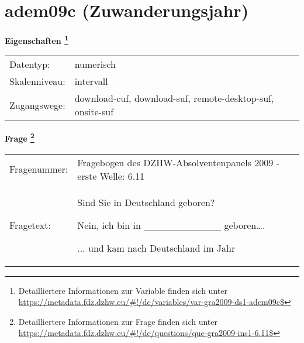 
    \setcounter{footnote}{0}

    \vspace*{-1.8cm}
	\section{adem09c (Zuwanderungsjahr)}
	\label{section:adem09c}



    \vspace*{0.5cm}
    \noindent\textbf{Eigenschaften
	\footnote{Detailliertere Informationen zur Variable finden sich unter
		\url{https://metadata.fdz.dzhw.eu/\#!/de/variables/var-gra2009-ds1-adem09c$}}}\\
	\begin{tabularx}{\hsize}{@{}lX}
	Datentyp: & numerisch \\
	Skalenniveau: & intervall \\
	Zugangswege: &
	  download-cuf, 
	  download-suf, 
	  remote-desktop-suf, 
	  onsite-suf
 \\
    \end{tabularx}



				\vspace*{0.5cm}
                \noindent\textbf{Frage
	                \footnote{Detailliertere Informationen zur Frage finden sich unter
		              \url{https://metadata.fdz.dzhw.eu/\#!/de/questions/que-gra2009-ins1-6.11$}}}\\
				\begin{tabularx}{\hsize}{@{}lX}
					Fragenummer: &
					  Fragebogen des DZHW-Absolventenpanels 2009 - erste Welle:
					  6.11
 \\
					Fragetext: & Sind Sie in Deutschland geboren?\par  Nein, ich bin in \_\_\_\_\_\_\_\_\_\_\_ geboren….\par  ... und kam nach Deutschland im Jahr \\
				\end{tabularx}





